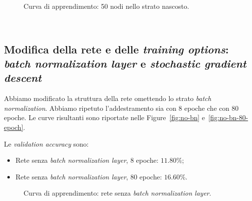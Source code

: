 \documentclass[a4paper,12pt]{article}
\begin{document}
\begin{figure}[htb]
    \hspace*{-2.1cm}
    \caption{Curva di apprendimento: 50 nodi nello strato nascosto.}
    \label{fig:50}
\end{figure}


\newpage ~ \newpage
\subsection{Modifica della rete e delle \emph{training options}: \emph{batch normalization layer} e \emph{stochastic gradient descent}}
Abbiamo modificato la struttura della rete omettendo lo strato \emph{batch normalization}. Abbiamo ripetuto l'addestramento sia con 8 epoche che con 80 epoche. Le curve risultanti sono riportate nelle Figure~\vref{fig:no-bn} e~\vref{fig:no-bn-80-epoch}.\medskip

Le \emph{validation accuracy} sono:
\begin{itemize}
    \item Rete senza \emph{batch normalization layer}, 8 epoche: $11.80\%$;
    \item Rete senza \emph{batch normalization layer}, 80 epoche: $16.60\%$.
\end{itemize}

\begin{figure}[htb]
    \hspace*{-2.1cm}
    \caption{Curva di apprendimento: rete senza \emph{batch normalization layer}.}
    \label{fig:no-bn}
\end{figure}
\end{document}

